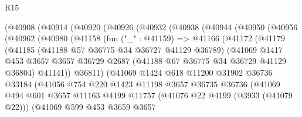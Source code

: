 \begin{lexlean}{R15}
\begin{coremodule}
          (@40908
            (@40914
              (@40920
                (@40926
                  (@40932
                    (@40938
                      (@40944
                        (@40950
                          (@40956
                            (@40962
                              (@40980
                                (@41158
                                  (fun ("_" : @41159) =>
                                  @41166
                                    (@41172
                                      (@41179
                                        (@41185
                                          (@41188 @57 @36775 @34 @36727 @41129 @36789)
                                          (@41069
                                            @1417
                                            @453
                                            @3657
                                            @3657
                                            @36729
                                            @2687
                                            (@41188 @67 @36775 @34 @36729 @41129 @36804)
                                            @41141))
                                        @36811)
                                      (@41069
                                        @1424
                                        @618
                                        @11200
                                        @31902
                                        @36736
                                        @33184
                                        (@41056
                                          @754
                                          @220
                                          @1423
                                          @11198
                                          @3657
                                          @36735
                                          @36736
                                          (@41069
                                            @494
                                            @601
                                            @3657
                                            @11163
                                            @4199
                                            @11757
                                            (@41076 @22 @4199 (@3933 (@41079 @22)))
                                            (@41069
                                              @599
                                              @453
                                              @3659
                                              @3657

\end{coremodule}
\end{lexlean}
